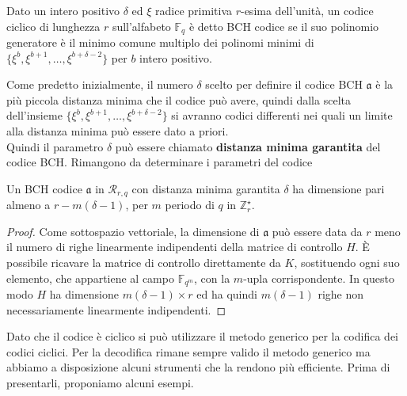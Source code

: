 \begin{definizione}
   Dato un intero positivo $\delta$ ed $\xi$ radice primitiva $r$-esima dell'unità, un codice ciclico di lunghezza $r$ sull'alfabeto $\mathbb{F}_{q}$ è detto BCH codice se il suo polinomio generatore è il minimo comune multiplo dei polinomi minimi di $\lbrace \xi^{b}, \xi^{b+1}, \dots,\xi^{b + \delta -2} \rbrace $ per $b$ intero positivo.
\end{definizione}
\noindent
Come predetto inizialmente, il numero $\delta$ scelto per definire il codice BCH $\mathfrak{a}$ è la più piccola distanza minima che il codice può avere, quindi dalla scelta dell'insieme $\lbrace \xi^{b}, \xi^{b+1}, \dots,\xi^{b + \delta -2} \rbrace $ si avranno codici differenti nei quali un limite alla distanza minima può essere dato a priori. \\
Quindi il parametro $\delta$ può essere chiamato {\bf distanza minima garantita} del codice BCH.
Rimangono da determinare i parametri del codice
 \begin{teorema}
    Un BCH codice $\mathfrak{a}$ in $\mathcal{R}_{r, q}$ con distanza minima garantita $\delta$ ha dimensione pari almeno a $r - m(\delta -1)$, per $m$ periodo di $q$ in $\mathbb{Z}_{r}^{\star}$.
 \end{teorema}
 \begin{proof}
    Come sottospazio vettoriale, la dimensione di $\mathfrak{a}$ può essere data da $r$ meno il numero di righe linearmente indipendenti della matrice di controllo $H$. È possibile ricavare la matrice di controllo direttamente da $K$, sostituendo ogni suo elemento, che appartiene al campo $\mathbb{F}_{q^m}$, con la $m$-upla corrispondente. In questo modo $H$ ha dimensione $m(\delta-1)\times r$ ed ha quindi $m(\delta-1)$ righe non necessariamente linearmente indipendenti.
 \end{proof}

Dato che il codice è ciclico si può utilizzare il metodo generico per la codifica dei codici ciclici. Per la decodifica rimane sempre valido il metodo generico ma abbiamo a disposizione alcuni strumenti che la rendono più efficiente. Prima di presentarli, proponiamo alcuni esempi.


